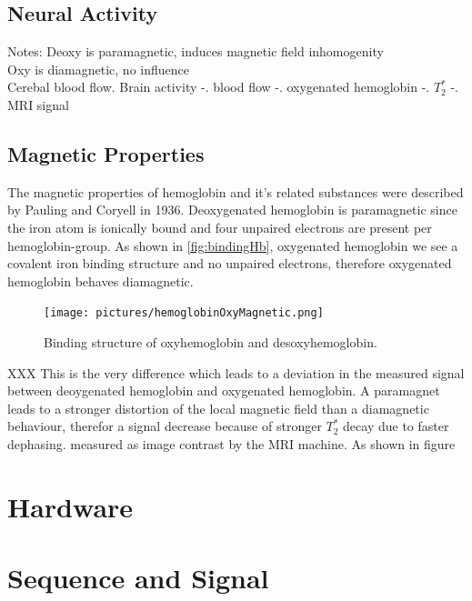 \documentclass[a4paper]{scrartcl}
\begin{document}
\subsection{Neural Activity}


Notes:
Deoxy is paramagnetic, induces magnetic field inhomogenity \\
Oxy is diamagnetic, no influence \\
Cerebal blood flow. Brain activity -. blood flow -. oxygenated hemoglobin -. $T_2^*$ -. MRI signal

\subsection{Magnetic Properties}
\label{sub:magneticProperties}
The magnetic properties of hemoglobin and it's related substances were described by Pauling and Coryell in 1936.\cite{pauling}
Deoxygenated hemoglobin is paramagnetic since the iron atom is ionically bound and four unpaired electrons are present per hemoglobin-group. 
As shown in \autoref{fig:bindingHb}, oxygenated hemoglobin we see a covalent iron binding structure and no unpaired electrons, therefore oxygenated hemoglobin behaves diamagnetic.\cite{Zborowski}
\begin{figure}[hb]
  \centering
  \texttt{[image: pictures/hemoglobinOxyMagnetic.png]}
  \caption{Binding structure of oxyhemoglobin and desoxyhemoglobin.\cite[2]{Bren}}
  \label{fig:bindingHb}
\end{figure}
XXX
This is the very difference which leads to a deviation in the measured signal between deoygenated hemoglobin and oxygenated hemoglobin.
A paramagnet leads to a stronger distortion of the local magnetic field than a diamagnetic behaviour, therefor a signal decrease because of stronger $T_2^*$ decay due to faster dephasing.
measured as image contrast by the MRI machine. As shown in figure  

\section{Hardware}
\label{sec:hardware}

\section{Sequence and Signal}
\label{sec:sequenceSignal}
\end{document}

